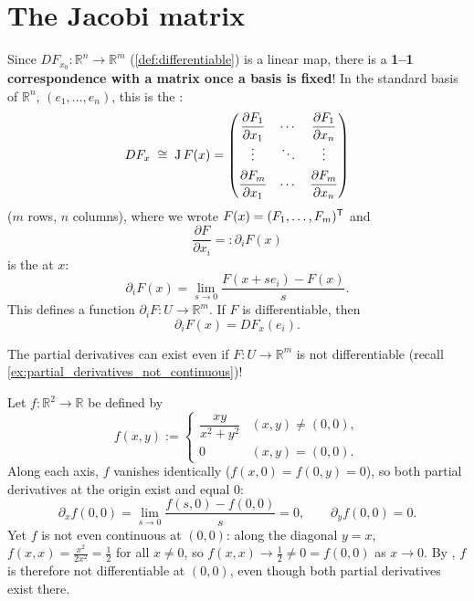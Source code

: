 
\section{The Jacobi matrix}
\label{sec:jacobi_matrix}

Since $DF_{x_0} : \mathbb{R}^n \to \mathbb{R}^m$ (\cref{def:differentiable}) is a linear map, there is a \textbf{1--1
correspondence with a matrix once a basis is fixed}! In the standard basis of $\mathbb{R}^n$,
$(e_1,\dots,e_n)$, this is the  :
\[DF_x \;\cong\; \operatorname{J} F(x) = \begin{pmatrix} \dfrac{\partial F_1}{\partial x_1} & \cdots & \dfrac{\partial F_1}{\partial x_n} \\[1ex] \vdots & \ddots & \vdots \\[1ex] \dfrac{\partial F_m}{\partial x_1} & \cdots & \dfrac{\partial F_m}{\partial x_n}\end{pmatrix}\]
($m$ rows, $n$ columns), where we wrote $F(x) = (F_1, \dots, F_m)^{\mathsf{T}}$ and
\[\frac{\partial F}{\partial x_i} =: \partial_i F(x)\]
is the   at $x$:
\[\partial_i F(x) = \lim_{s\to 0}\frac{F(x+se_i)-F(x)}{s}.\]
This defines a function $\partial_i F : U \to \mathbb{R}^m$. If $F$ is differentiable, then
\[\partial_i F(x) = DF_x(e_i).\]

\begin{importantremark}
The partial derivatives can exist even if $F : U \to \mathbb{R}^m$ is not differentiable (recall \cref{ex:partial_derivatives_not_continuous})!
\end{importantremark}

\begin{aiexample}
\label{ex:partial_derivatives_not_continuous}
Let $f : \mathbb{R}^2 \to \mathbb{R}$ be defined by
\[f(x,y) := \begin{cases} \dfrac{xy}{x^2+y^2} & (x,y) \neq (0,0), \\ 0 & (x,y) = (0,0). \end{cases}\]
Along each axis, $f$ vanishes identically ($f(x,0) = f(0,y) = 0$), so both partial derivatives at
the origin exist and equal $0$:
\[\partial_x f(0,0) = \lim_{s\to 0}\frac{f(s,0)-f(0,0)}{s} = 0, \qquad \partial_y f(0,0) = 0.\]
Yet $f$ is not even continuous at $(0,0)$: along the diagonal $y=x$, $f(x,x) = \tfrac{x^2}{2x^2} =
\tfrac12$ for all $x \neq 0$, so $f(x,x) \to \tfrac12 \neq 0 = f(0,0)$ as $x \to 0$. By
, $f$ is therefore not differentiable at $(0,0)$,
even though both partial derivatives exist there.
\end{aiexample}

